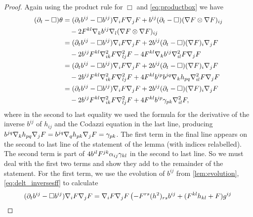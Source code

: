 \documentclass{amsart}
\begin{document}
\begin{proof}
Again using the product rule for \(\Box\) and \eqref{eq:productbox} we have
\begin{equation}
\label{eq:delt_theta}
\begin{split}
(\partial_{t} - \Box)\theta &= (\partial_{t}b^{ij} - \Box b^{ij})\nabla_i F\nabla_jF + b^{ij} (\partial_{t} - \Box) (\nabla F \otimes \nabla F)_{ij} \\
&\quad - 2 F^{kl} \nabla_k b^{ij} \nabla_l (\nabla F \otimes \nabla F)_{ij} \\
&= (\partial_{t}b^{ij} - \Box b^{ij})\nabla_i F\nabla_jF + 2 b^{ij} (\partial_{t} - \Box) (\nabla F)_i \nabla_jF\\
&\quad - 2 b^{ij} F^{kl} \nabla^2_{ik} F \nabla^2_{lj} F - 4 F^{kl} \nabla_k b^{ij} \nabla^2_{il} F \nabla_jF \\
&= (\partial_{t}b^{ij} - \Box b^{ij})\nabla_i F\nabla_jF + 2 b^{ij} (\partial_{t} - \Box) (\nabla F)_i \nabla_jF \\
&\quad - 2 b^{ij} F^{kl} \nabla^2_{ik} F \nabla^2_{lj} F + 4 F^{kl} b^{ip}b^{jq} \nabla_k h_{pq} \nabla^2_{il} F \nabla_jF \\
&= (\partial_{t}b^{ij} - \Box b^{ij})\nabla_i F\nabla_jF + 2 b^{ij} (\partial_{t} - \Box) (\nabla F)_i \nabla_jF \\
&\quad - 2 b^{ij} F^{kl} \nabla^2_{ik} F \nabla^2_{lj} F + 4 F^{kl} b^{ip}\gamma_{pk} \nabla^2_{il} F,
\end{split}
\end{equation}
where in the second to last equality we used the formula for the derivative of the inverse \(b^{ij}\) of \(h_{ij}\) and the Codazzi equation in the last line, producing \(b^{jq} \nabla_k h_{pq} \nabla_j F = b^{jq} \nabla_q h_{pk} \nabla_j F = \gamma_{pk}\). The first term in the final line appears on the second to last line of the statement of the lemma (with indices relabelled). The second term is part of \(4 b^{il}F^{jk} \alpha_{ij} \gamma_{kl}\) in the second to last line. So we must deal with the first two terms and show they add to the remainder of the statement. For the first term, we use the evolution of \(b^{ij}\) from \cref{lem:evolution}, \cref{eq:delt_inversesff} to calculate
\begin{equation}
\label{eq:delt_theta1}
\begin{split}
(\partial_{t}b^{ij} - \Box b^{ij})\nabla_i \p\nabla_j\p &= \nabla_i \p \nabla_j \p\left(-\p^{rs} (h^2)_{rs} b^{ij} + (\p^{kl}h_{kl} + \p) g^{ij} \right. \\

\end{split}
\end{equation}
\end{proof}
\end{document}
